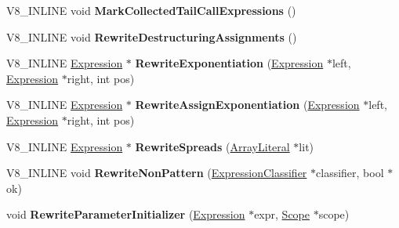 \begin{DoxyCompactItemize}
\item 
V8\+\_\+\+I\+N\+L\+I\+NE void {\bfseries Mark\+Collected\+Tail\+Call\+Expressions} ()\hypertarget{classv8_1_1internal_1_1_parser_a2e081fe80141edf3cf947f0b9a3173ff}{}\label{classv8_1_1internal_1_1_parser_a2e081fe80141edf3cf947f0b9a3173ff}

\item 
V8\+\_\+\+I\+N\+L\+I\+NE void {\bfseries Rewrite\+Destructuring\+Assignments} ()\hypertarget{classv8_1_1internal_1_1_parser_a25f53e7d873a611ff526ed0c1f749a1c}{}\label{classv8_1_1internal_1_1_parser_a25f53e7d873a611ff526ed0c1f749a1c}

\item 
V8\+\_\+\+I\+N\+L\+I\+NE \hyperlink{classv8_1_1internal_1_1_expression}{Expression} $\ast$ {\bfseries Rewrite\+Exponentiation} (\hyperlink{classv8_1_1internal_1_1_expression}{Expression} $\ast$left, \hyperlink{classv8_1_1internal_1_1_expression}{Expression} $\ast$right, int pos)\hypertarget{classv8_1_1internal_1_1_parser_abaf547f75d2e8a733524fc97b612c1b4}{}\label{classv8_1_1internal_1_1_parser_abaf547f75d2e8a733524fc97b612c1b4}

\item 
V8\+\_\+\+I\+N\+L\+I\+NE \hyperlink{classv8_1_1internal_1_1_expression}{Expression} $\ast$ {\bfseries Rewrite\+Assign\+Exponentiation} (\hyperlink{classv8_1_1internal_1_1_expression}{Expression} $\ast$left, \hyperlink{classv8_1_1internal_1_1_expression}{Expression} $\ast$right, int pos)\hypertarget{classv8_1_1internal_1_1_parser_adf84be0d56a24b1e423634124e27950b}{}\label{classv8_1_1internal_1_1_parser_adf84be0d56a24b1e423634124e27950b}

\item 
V8\+\_\+\+I\+N\+L\+I\+NE \hyperlink{classv8_1_1internal_1_1_expression}{Expression} $\ast$ {\bfseries Rewrite\+Spreads} (\hyperlink{classv8_1_1internal_1_1_array_literal}{Array\+Literal} $\ast$lit)\hypertarget{classv8_1_1internal_1_1_parser_a0918a3f3bb1f224bc70c06878e88f7fe}{}\label{classv8_1_1internal_1_1_parser_a0918a3f3bb1f224bc70c06878e88f7fe}

\item 
V8\+\_\+\+I\+N\+L\+I\+NE void {\bfseries Rewrite\+Non\+Pattern} (\hyperlink{classv8_1_1internal_1_1_expression_classifier}{Expression\+Classifier} $\ast$classifier, bool $\ast$ok)\hypertarget{classv8_1_1internal_1_1_parser_aa21fa81cea994bf1abeab42b98628a12}{}\label{classv8_1_1internal_1_1_parser_aa21fa81cea994bf1abeab42b98628a12}

\item 
void {\bfseries Rewrite\+Parameter\+Initializer} (\hyperlink{classv8_1_1internal_1_1_expression}{Expression} $\ast$expr, \hyperlink{classv8_1_1internal_1_1_scope}{Scope} $\ast$scope)\hypertarget{classv8_1_1internal_1_1_parser_a7e1cf1632d3b63d659cd9843a638dae9}{}\label{classv8_1_1internal_1_1_parser_a7e1cf1632d3b63d659cd9843a638dae9}

\end{DoxyCompactItemize}
